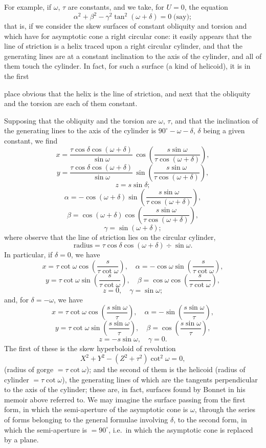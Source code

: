 \documentclass[11pt,a4paper]{article}
\begin{document}
For example, if $\omega$, $\tau$ are constants, and we take, for $U = 0$, the equation
\[
\alpha^2 + \beta^2 - \gamma^2 \tan^2(\omega + \delta) = 0\;\text{(say)};
\]
that is, if we consider the skew surfaces of constant obliquity and torsion and which have for asymptotic cone a right circular cone: it easily appears that the line of striction is a helix traced upon a right circular cylinder, and that the generating lines are at a constant inclination to the axis of the cylinder, and all of them touch the cylinder. In fact, for such a surface (a kind of helicoid), it is in the first

place obvious that the helix is the line of striction, and next that the obliquity and the torsion are each of them constant.

Supposing that the obliquity and the torsion are $\omega$, $\tau$, and that the inclination of the generating lines to the axis of the cylinder is $90^\circ - \omega - \delta$, $\delta$ being a given constant, we find
\[
x = \frac{\tau \cos\delta \cos(\omega + \delta)}{\sin\omega}\,\cos\!\left(\frac{s \sin\omega}{\tau \cos(\omega + \delta)}\right),
\]
\[
y = \frac{\tau \cos\delta \cos(\omega + \delta)}{\sin\omega}\,\sin\!\left(\frac{s \sin\omega}{\tau \cos(\omega + \delta)}\right),
\]
\[
z = s \sin\delta;
\]
\[
\alpha = -\cos(\omega + \delta)\sin\!\left(\frac{s \sin\omega}{\tau \cos(\omega + \delta)}\right),
\]
\[
\beta = \cos(\omega + \delta)\cos\!\left(\frac{s \sin\omega}{\tau \cos(\omega + \delta)}\right),
\]
\[
\gamma = \sin(\omega + \delta);
\]
where observe that the line of striction lies on the circular cylinder,
\[
\text{radius} = \tau \cos\delta \cos(\omega + \delta)\div \sin\omega.
\]
In particular, if $\delta = 0$, we have
\[
x = \tau \cot\omega \cos\!\left(\frac{s}{\tau \cot\omega}\right),\quad \alpha = -\cos\omega \sin\!\left(\frac{s}{\tau \cot\omega}\right),
\]
\[
y = \tau \cot\omega \sin\!\left(\frac{s}{\tau \cot\omega}\right),\quad \beta = \cos\omega \cos\!\left(\frac{s}{\tau \cot\omega}\right),
\]
\[
z = 0,\quad \gamma = \sin\omega;
\]
and, for $\delta = -\omega$, we have
\[
x = \tau \cot\omega \cos\!\left(\frac{s \sin\omega}{\tau}\right),\quad \alpha = -\sin\!\left(\frac{s \sin\omega}{\tau}\right),
\]
\[
y = \tau \cot\omega \sin\!\left(\frac{s \sin\omega}{\tau}\right),\quad \beta = \cos\!\left(\frac{s \sin\omega}{\tau}\right),
\]
\[
z = -s \sin\omega,\quad \gamma = 0.
\]
The first of these is the skew hyperboloid of revolution
\[
X^2 + Y^2 - (Z^2 + \tau^2)\cot^2\omega = 0,
\]
(radius of gorge $=\tau\cot\omega$); and the second of them is the helicoid (radius of cylinder $=\tau\cot\omega$), the generating lines of which are the tangents perpendicular to the axis of the cylinder; these are, in fact, surfaces found by Bonnet in his memoir above referred to. We may imagine the surface passing from the first form, in which the semi-aperture of the asymptotic cone is $\omega$, through the series of forms belonging to the general formulae involving $\delta$, to the second form, in which the semi-aperture is $=90^\circ$, i.e.\ in which the asymptotic cone is replaced by a plane.
\end{document}
